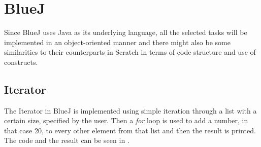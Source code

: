 \section{BlueJ}
\label{sec:bluej}
Since BlueJ uses Java as its underlying language, all the selected tasks will be implemented in an object-oriented manner and there might also be some similarities to their counterparts in Scratch in terms of code structure and use of constructs.
\subsection{Iterator}
The Iterator in BlueJ is implemented using simple iteration through a list with a certain size, specified by the user. Then a \textit{for} loop is used to add a number, in that case 20, to every other element from that list and then the result is printed. The code and the result can be seen in . %

